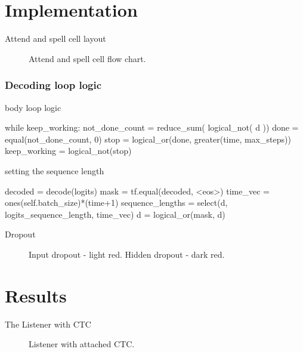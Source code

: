 \documentclass{beamer}
\begin{document}
\section{Implementation}
\begin{frame}{Attend and spell cell layout}
	\begin{figure}
	
	\caption{Attend and spell cell flow chart.}
	\end{figure}
\end{frame}

\begin{frame}[fragile]
\frametitle{Decoding loop logic}
\begin{block}{body loop logic}
	\begin{semiverbatim}
	while keep_working:
	  not_done_count = reduce_sum( logical_not( d ))
	  done = equal(not_done_count, 0)
	  stop = logical_or(done, greater(time, max_steps))
	  keep_working = logical_not(stop)
	\end{semiverbatim}
\end{block}
\begin{block}{setting the sequence length}
	\begin{semiverbatim}
	  decoded = decode(logits)
	  mask = tf.equal(decoded, <eos>)
	  time_vec = ones(self.batch_size)*(time+1)
	  sequence_lengths = select(d,
	                            logits_sequence_length,
	                            time_vec)
	  d = logical_or(mask, d)
	\end{semiverbatim}
\end{block}
\end{frame}

\begin{frame}{Dropout}
	\begin{figure}
		
		\caption{Input dropout - light red. Hidden dropout - dark red.}
	\end{figure}
\end{frame}

\section{Results}
\begin{frame}{The Listener with CTC}
	\begin{figure}
		
		
		\caption{Listener with attached CTC.}
	\end{figure}
\end{frame}
\end{document}
